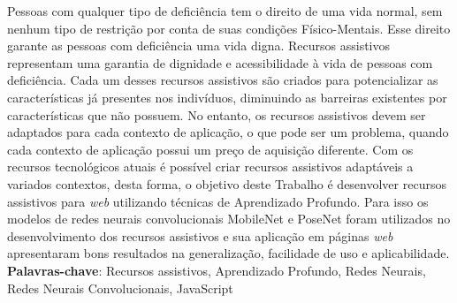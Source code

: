 \setlength{\absparsep}{18pt} %
\begin{resumo}
    \par Pessoas com qualquer tipo de deficiência tem o direito de uma vida normal, sem nenhum tipo de restrição por conta de suas condições Físico-Mentais. Esse direito garante as pessoas com deficiência uma vida digna. Recursos assistivos representam uma garantia de dignidade e acessibilidade à vida de pessoas com deficiência. Cada um desses recursos assistivos são criados para potencializar as características já presentes nos indivíduos, diminuindo as barreiras existentes por características que não possuem. No entanto, os recursos assistivos devem ser adaptados para cada contexto de aplicação, o que pode ser um problema, quando cada contexto de aplicação possui um preço de aquisição diferente. Com os recursos tecnológicos atuais é possível criar recursos assistivos adaptáveis a variados contextos, desta forma, o objetivo deste Trabalho é desenvolver recursos assistivos para \textit{web} utilizando técnicas de Aprendizado Profundo. Para isso os modelos de redes neurais convolucionais MobileNet e PoseNet foram utilizados no desenvolvimento dos recursos assistivos e sua aplicação em páginas \textit{web} apresentaram bons resultados na generalização, facilidade de uso e aplicabilidade.
    \vspace{\onelineskip}
    \noindent
    \\
    \textbf{Palavras-chave}: Recursos assistivos, Aprendizado Profundo, Redes Neurais, Redes Neurais Convolucionais, JavaScript
\end{resumo}

